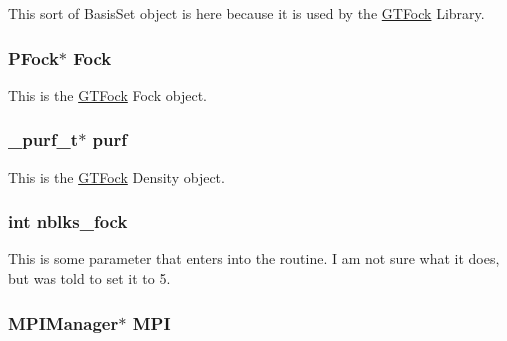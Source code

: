This sort of BasisSet object is here because it is used by the \hyperlink{namespaceGTFock}{GTFock} Library. \hypertarget{classGTFock_1_1DistGTFock_a4d2250740bf39e3a0f585c264a79f902}{
\subsubsection[{Fock}]{\setlength{\rightskip}{0pt plus 5cm}PFock$\ast$ {\bf Fock}}}
\label{classGTFock_1_1DistGTFock_a4d2250740bf39e3a0f585c264a79f902}


This is the \hyperlink{namespaceGTFock}{GTFock} Fock object. \hypertarget{classGTFock_1_1DistGTFock_a67a350742753030caf0b3e66027d6d4b}{
\subsubsection[{purf}]{\setlength{\rightskip}{0pt plus 5cm}\_\-purf\_\-t$\ast$ {\bf purf}}}
\label{classGTFock_1_1DistGTFock_a67a350742753030caf0b3e66027d6d4b}


This is the \hyperlink{namespaceGTFock}{GTFock} Density object. \hypertarget{classGTFock_1_1DistGTFock_a13c5e6c87e46d3ddac36125f8c824736}{
\subsubsection[{nblks\_\-fock}]{\setlength{\rightskip}{0pt plus 5cm}int {\bf nblks\_\-fock}}}
\label{classGTFock_1_1DistGTFock_a13c5e6c87e46d3ddac36125f8c824736}


This is some parameter that enters into the routine. I am not sure what it does, but was told to set it to 5. \hypertarget{classJKBuilder_1_1DistributionCenter_a3753afd7c89e077643a274ed7c4e9129}{
\subsubsection[{MPI}]{\setlength{\rightskip}{0pt plus 5cm}MPIManager$\ast$ {\bf MPI}}}
\label{classJKBuilder_1_1DistributionCenter_a3753afd7c89e077643a274ed7c4e9129}


